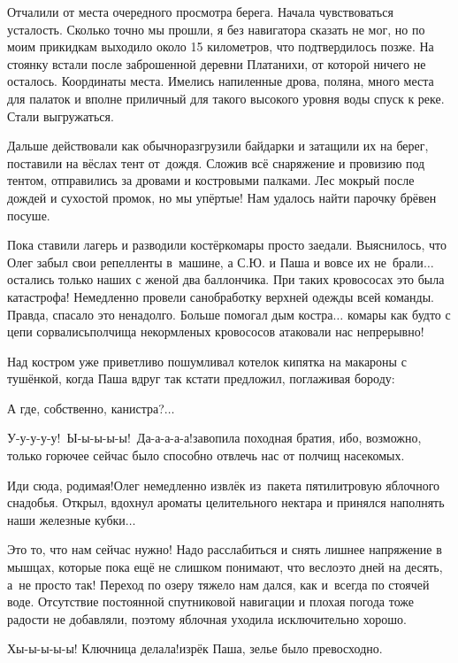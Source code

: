 Отчалили от места очередного просмотра берега. Начала чувствоваться усталость. Сколько точно мы прошли, я без навигатора сказать не мог, но по моим прикидкам выходило около 15 километров, что подтвердилось позже. На стоянку встали после заброшенной деревни Платанихи, от которой ничего не осталось. Координаты места\mdash \CoordsLidSeventeenFirst. Имелись напиленные дрова, поляна, много места для палаток и вполне приличный для такого высокого уровня воды спуск к реке. Стали выгружаться. 

Дальше действовали как обычно\mdash разгрузили байдарки и затащили их на берег, поставили на вёслах тент от~дождя. Сложив всё снаряжение и провизию под тентом, отправились за дровами и костровыми палками. Лес мокрый после дождей и сухостой промок, но мы упёртые! Нам удалось найти парочку брёвен посуше. 

Пока ставили лагерь и разводили костёр\mdash комары просто заедали. Выяснилось, что Олег забыл свои репелленты в~машине, а С.Ю. и Паша и вовсе их не~брали$\ldots$ остались только наших с женой два баллончика. При таких кровососах это была катастрофа! Немедленно провели санобработку верхней одежды всей команды. Правда, спасало это ненадолго. Больше помогал дым костра$\ldots$ комары как будто с цепи сорвались\mdash полчища некормленых кровососов атаковали нас непрерывно!

Над костром уже приветливо пошумливал котелок кипятка на макароны с тушёнкой, когда Паша вдруг так кстати предложил, поглаживая бороду: 

\diagdash А где, собственно, канистра?$\ldots$

\diagdash У-у-у-у-у!~Ы-ы-ы-ы-ы!~Да-а-а-а-а!\mdash завопила походная братия, ибо, возможно, только горючее сейчас было способно отвлечь нас от полчищ насекомых.
 
\diagdash Иди сюда, родимая!\mdash Олег немедленно извлёк из~пакета пятилитровую яблочного снадобья. Открыл, вдохнул ароматы целительного нектара и принялся наполнять наши железные кубки$\ldots$

Это то, что нам сейчас нужно! Надо расслабиться и снять лишнее напряжение в мышцах, которые пока ещё не слишком понимают, что весло\mdash это дней на десять, а~не просто так! Переход по озеру тяжело нам дался, как и~всегда по стоячей воде. Отсутствие постоянной спутниковой навигации и плохая погода тоже радости не добавляли, поэтому яблочная уходила исключительно хорошо.

\diagdash Хы-ы-ы-ы-ы! Ключница делала!\mdash изрёк Паша, зелье было превосходно.

